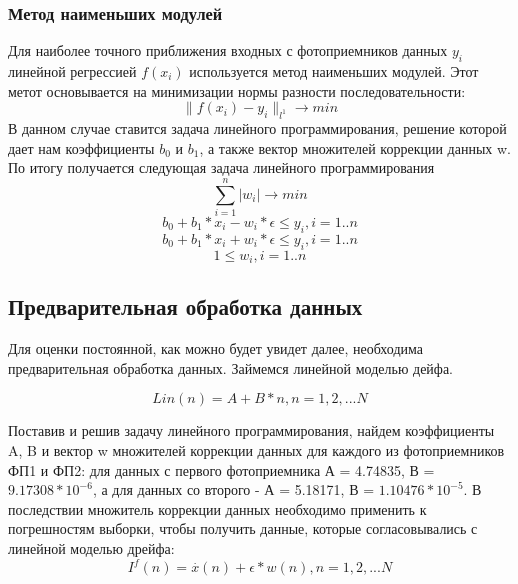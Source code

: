 \documentclass[main.tex]{subfiles}
\begin{document}
        \subsubsection{Метод наименьших модулей}
        Для наиболее точного приближения входных с фотоприемников данных $y_i$ линейной регрессией $f(x_i)$ используется метод наименьших модулей. Этот метот основывается на минимизации нормы разности последовательности:
        \begin{equation}
            \| f(x_i) - y_i\|_{l^1} \rightarrow min
        \end{equation}
        В данном случае ставится задача линейного программирования, решение которой дает нам коэффициенты $b_0$ и $b_1$, а также вектор множителей коррекции данных w.
        По итогу получается следующая задача линейного программирования
        \begin{equation}
            \sum_{i=1}^n |w_i| \rightarrow min
        \end{equation}
        \begin{equation}
            b_0 + b_1*x_i - w_i * \epsilon \leq y_i, i = 1..n
        \end{equation}
        \begin{equation}
            b_0 + b_1*x_i + w_i * \epsilon \leq y_i, i = 1..n
        \end{equation}
        \begin{equation}
            1 \leq w_i , i = 1..n
        \end{equation}
        
        \subsection{Предварительная обработка данных}
        Для оценки постоянной, как можно будет увидет далее,  необходима предварительная обработка данных. Займемся линейной моделью дейфа.
        
        \begin{equation}
            Lin(n) = A + B * n, n = 1, 2, ... N
        \end{equation}
        
        Поставив и решив задачу линейного программирования, найдем коэффициенты A, B и вектор w множителей коррекции данных для каждого из фотоприемников ФП1 и ФП2: для данных с первого фотоприемника А = 4.74835, В = $9.17308*10^{-6}$, а для данных со второго - А = 5.18171, В = $1.10476*10^{-5}$. В последствии множитель коррекции данных необходимо применить к погрешностям выборки, чтобы получить данные, которые согласовывались с линейной моделью дрейфа:
        \begin{equation}
            I^f(n) = \overset{.}{x}(n) + \epsilon * w(n), n = 1, 2, ... N
        \end{equation}
        
\end{document}
